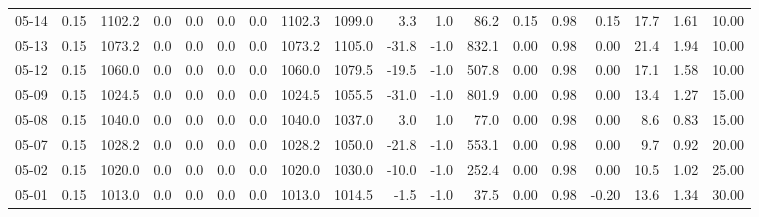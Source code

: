 \begin{threeparttable}
{\begin{tabular}{lrrrrrrrrrrrrrrrrr}
  05-14 &     0.15 & 1102.2 &               0.0 &               0.0 &                0.0 &                0.0 & 1102.3 & 1099.0 &        3.3 &                      1.0 &                86.2 &       0.15 &      0.98 &           0.15 &             17.7 &            1.61 &                  10.00 \\
  05-13 &     0.15 & 1073.2 &               0.0 &               0.0 &                0.0 &                0.0 & 1073.2 & 1105.0 &      -31.8 &                     -1.0 &               832.1 &       0.00 &      0.98 &           0.00 &             21.4 &            1.94 &                  10.00 \\
  05-12 &     0.15 & 1060.0 &               0.0 &               0.0 &                0.0 &                0.0 & 1060.0 & 1079.5 &      -19.5 &                     -1.0 &               507.8 &       0.00 &      0.98 &           0.00 &             17.1 &            1.58 &                  10.00 \\
  05-09 &     0.15 & 1024.5 &               0.0 &               0.0 &                0.0 &                0.0 & 1024.5 & 1055.5 &      -31.0 &                     -1.0 &               801.9 &       0.00 &      0.98 &           0.00 &             13.4 &            1.27 &                  15.00 \\
  05-08 &     0.15 & 1040.0 &               0.0 &               0.0 &                0.0 &                0.0 & 1040.0 & 1037.0 &        3.0 &                      1.0 &                77.0 &       0.00 &      0.98 &           0.00 &              8.6 &            0.83 &                  15.00 \\
  05-07 &     0.15 & 1028.2 &               0.0 &               0.0 &                0.0 &                0.0 & 1028.2 & 1050.0 &      -21.8 &                     -1.0 &               553.1 &       0.00 &      0.98 &           0.00 &              9.7 &            0.92 &                  20.00 \\
  05-02 &     0.15 & 1020.0 &               0.0 &               0.0 &                0.0 &                0.0 & 1020.0 & 1030.0 &      -10.0 &                     -1.0 &               252.4 &       0.00 &      0.98 &           0.00 &             10.5 &            1.02 &                  25.00 \\
  05-01 &     0.15 & 1013.0 &               0.0 &               0.0 &                0.0 &                0.0 & 1013.0 & 1014.5 &       -1.5 &                     -1.0 &                37.5 &       0.00 &      0.98 &          -0.20 &             13.6 &            1.34 &                  30.00 \\

\end{tabular}}
\end{threeparttable}
